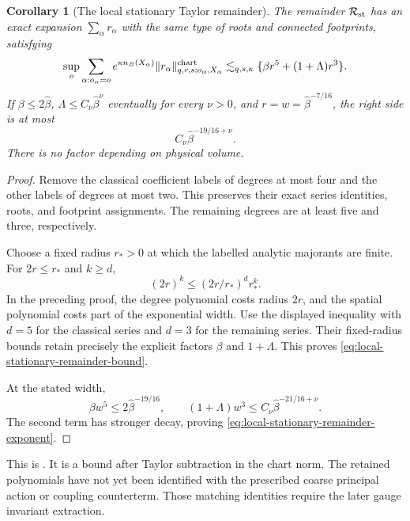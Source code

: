 \documentclass[11pt,reqno]{amsart}
\numberwithin{equation}{section}
\newtheorem{corollary}[theorem]{Corollary}
\theoremstyle{definition}
\theoremstyle{remark}
\begin{document}
\begin{corollary}[The local stationary Taylor remainder]
\label{cor:local-stationary-remainder}
The remainder \(\mathcal R_{\rm st}\) has an exact
expansion \(\sum_\alpha r_\alpha\) with the same
type of roots and connected footprints, satisfying
\begin{equation}
 \sup_o\sum_{\alpha:o_\alpha=o}
 e^{\kappa n_B(X_\alpha)}
 \|r_\alpha\|^{\rm chart}_{q,r,s;o_\alpha,X_\alpha}
       \lesssim_{q,s,\kappa}
                    \{\beta r^5+(1+\Lambda)r^3\}.
 \label{eq:local-stationary-remainder-bound}
\end{equation}
If \(\beta\le2\widehat\beta\),
\(\Lambda\le C_\nu\widehat\beta^\nu\) eventually
for every \(\nu>0\), and
\(r=w=\widehat\beta^{-7/16}\), the right side
is at most
\begin{equation}
                     C_\nu\widehat\beta^{-19/16+\nu}.
 \label{eq:local-stationary-remainder-exponent}
\end{equation}
There is no factor depending on physical volume.
\end{corollary}
\begin{proof}
Remove the classical coefficient labels of degrees
at most four and the other labels of degrees at most
two. This preserves their exact series identities,
roots, and footprint assignments.
The remaining degrees are at least five and three,
respectively.

Choose a fixed radius \(r_*>0\) at which the
labelled analytic majorants are finite.
For \(2r\le r_*\) and \(k\ge d\),
\[
                     (2r)^k
                         \le(2r/r_*)^d r_*^k.
\]
In the preceding proof, the degree polynomial
costs radius \(2r\), and the spatial polynomial
costs part of the exponential width.
Use the displayed inequality with \(d=5\)
for the classical series and \(d=3\) for
the remaining series.
Their fixed-radius bounds retain precisely the
explicit factors \(\beta\) and \(1+\Lambda\).
This proves \eqref{eq:local-stationary-remainder-bound}.

At the stated width,
\[
       \beta w^5\le2\widehat\beta^{-19/16},\qquad
       (1+\Lambda)w^3
                   \le C_\nu\widehat\beta^{-21/16+\nu}.
\]
The second term has stronger decay, proving
\eqref{eq:local-stationary-remainder-exponent}.
\end{proof}

This is \cite[Corollary~16.8 and (16.16)--(16.17),
p.~85]{Main}. It is a bound after Taylor
subtraction in the chart norm.
The retained polynomials have not yet been
identified with the prescribed coarse principal
action or coupling counterterm.
Those matching identities require the later
gauge invariant extraction.
\end{document}
